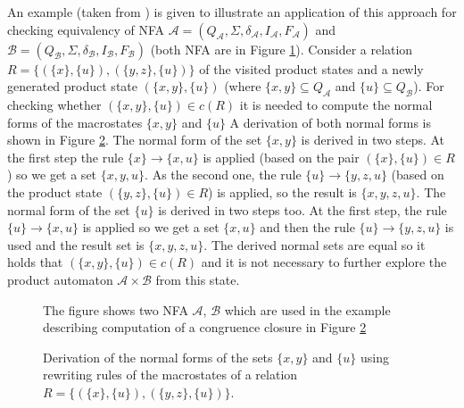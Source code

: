 An example (taken from \cite{popl13}) is given to illustrate an application of this approach for checking equivalency of 
NFA $\mathcal{A}=(Q_\mathcal{A},\Sigma,\delta_\mathcal{A},I_\mathcal{A},F_\mathcal{A})$ 
and $\mathcal{B}=(Q_\mathcal{B},\Sigma,\delta_\mathcal{B},I_\mathcal{B},F_\mathcal{B})$ (both NFA are in Figure \ref{figHKCex}). 
Consider a relation $R=\{(\{x\},\{u\}),(\{y,z\},\{u\})\}$ of the visited product states and a newly generated product state 
$(\{x,y\},\{u\})$ (where $\{x,y\}\subseteq Q_\mathcal{A}$ and 
$\{u\} \subseteq Q_\mathcal{B}$). For checking whether $(\{x,y\},\{u\})\in c(R)$ it is needed to compute the normal forms of the macrostates $\{x,y\}$ and $\{u\}$ 
A derivation of both normal forms is shown in Figure \ref{figHKCRew}. 
The normal form of the set $\{x,y\}$ is derived in two steps.
At the first step the rule $\{x\}\rightarrow\{x,u\}$ is applied (based on the pair $(\{x\},\{u\})\in R$) so we get a set $\{x,y,u\}$. As the second one, the rule 
$\{u\}\rightarrow\{y,z,u\}$ (based on the product state $(\{y,z\},\{u\})\in R$) is applied, so the result is $\{x,y,z,u\}$. The normal form of the set $\{u\}$
is derived in two steps too. At the first step, the rule $\{u\}\rightarrow\{x,u\}$ is applied so we get a set $\{x,u\}$ and then the rule 
$\{u\}\rightarrow\{y,z,u\}$ is used and the result set is $\{x,y,z,u\}$. The derived normal sets are equal so it holds that $(\{x,y\},\{u\})\in c(R)$ and
it is not necessary to further explore the product automaton $\mathcal{A}\times \mathcal{B}$ from this state.

\begin{figure}[tb]
\begin{center}
  
  
    \caption{The figure shows two NFA $\mathcal{A}$, $\mathcal{B}$ 
      which are used in the example describing computation of a congruence closure in Figure \ref{figHKCRew}}
		\label{figHKCex}
\end{center}
\end{figure}

\begin{figure}[bt]
  \begin{center}
    
    \caption{Derivation of the normal forms of the sets $\{x,y\}$ and $\{u\}$ using rewriting
      rules of the macrostates of a relation $R=\{(\{x\},\{u\}),(\{y,z\},\{u\})\}$.}
    \label{figHKCRew}
  \end{center}
\end{figure}

